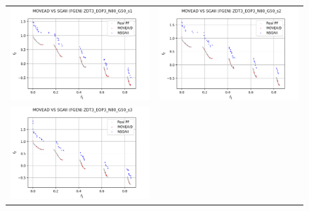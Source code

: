 \begin{figure}[H]
    \centering
    \begin{tabular}{c c}
    \includegraphics[scale=0.5]{figures/ZDT3_EOP3_N80_G50_T12/s1_comp.png} &
    \includegraphics[scale=0.5]{figures/ZDT3_EOP3_N80_G50_T12/s2_comp.png}\\
    \includegraphics[scale=0.5]{figures/ZDT3_EOP3_N80_G50_T12/s3_comp.png} &

\end{tabular}
\end{figure}

